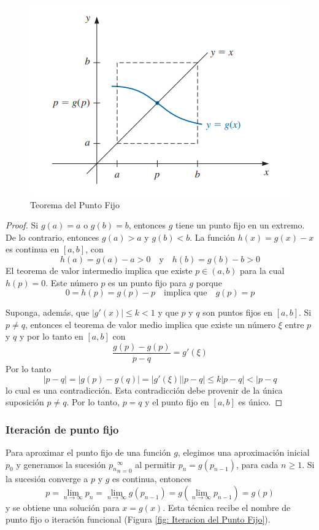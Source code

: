 \begin{figure}[h]
    \centering
    \includegraphics[width = 0.5 \textwidth]{Imagenes/6 - Teorema del Punto Fijo.png}
    \caption{Teorema del Punto Fijo}
    \label{fig: Teorema del Punto Fijo}
\end{figure}

\begin{proof}
    Si $g(a) = a$ o $g(b) = b$, entonces $g$ tiene un punto fijo en un extremo. De lo contrario, entonces $g(a) > a$ y $g(b) < b$. La función $h(x) = g(x) - x$ es continua en $[a, b]$, con
    \[h(a) = g(a) - a > 0 \quad \text{y} \quad h(b) = g(b) - b > 0 \]
    El teorema de valor intermedio implica que existe $p \in (a, b)$ para la cual $h(p) = 0$. Este número $p$ es un punto fijo para $g$ porque
    \[ 0 = h(p) = g(p) - p \quad \text{implica que} \quad g(p) = p\]

    Suponga, además, que $|g'(x)| \leq k < 1$ y que $p$ y $q$ son puntos fijos en $[a, b]$. Si $p \neq q$, entonces el teorema de valor medio implica que existe un número $\xi$ entre $p$ y $q$ y por lo tanto en $[a, b]$ con
    \[ \frac{g(p) - g(p)}{p - q} = g'(\xi)\]
    Por lo tanto
    \[ |p - q| = |g(p) - g(q)| = |g'(\xi)| |p - q| \leq k |p - q| < |p - q \]
    lo cual es una contradicción. Esta contradicción debe provenir de la única suposición $p \neq q$. Por lo tanto, $p = q$ y el punto fijo en $[a, b]$ es único.
\end{proof}

\subsubsection{Iteración de punto fijo}
Para aproximar el punto fijo de una función $g$, elegimos una aproximación inicial $p_0$ y generamos la sucesión ${p_n}_{n = 0}^\infty$ al permitir $p_n = g(p_{n-1})$, para cada $n \geq 1$. Si la sucesión converge a $p$ y $g$ es continua, entonces
\[p = \lim_{n \rightarrow \infty}{p_n} = \lim_{n \rightarrow \infty}{g (p_{n - 1})} = g \left( \lim_{n \rightarrow \infty}{p_{n - 1}} \right) = g(p)\]
y se obtiene una solución para $x = g(x)$. Esta técnica recibe el nombre de punto fijo o iteración funcional (Figura \ref{fig: Iteracion del Punto Fijo}).

